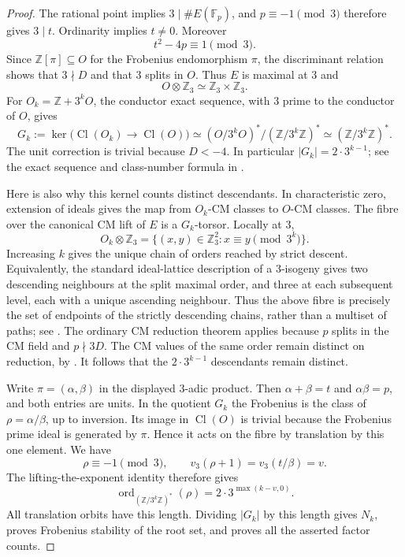 \documentclass[11pt]{article}
\theoremstyle{definition}
\theoremstyle{remark}
\begin{document}
\begin{proof}
The rational point implies $3\mid\#E(\mathbb F_p)$, and
$p\equiv-1\pmod3$ therefore gives $3\mid t$.
Ordinarity implies $t\ne0$.  Moreover
\[
 t^2-4p\equiv1\pmod3.
\]
Since $\mathbb Z[\pi]\subseteq O$ for the Frobenius endomorphism
$\pi$, the discriminant relation shows that $3\nmid D$ and
that $3$ splits in $O$.  Thus $E$ is maximal at $3$ and
\[
 O\otimes\mathbb Z_3\simeq\mathbb Z_3\times\mathbb Z_3.
\]
For $O_k=\mathbb Z+3^kO$, the conductor exact sequence, with
$3$ prime to the conductor of $O$, gives
\[
 G_k:=\ker\bigl(\operatorname{Cl}(O_k)\longrightarrow
                         \operatorname{Cl}(O)\bigr)
 \simeq (O/3^kO)^*/(\mathbb Z/3^k\mathbb Z)^*
 \simeq(\mathbb Z/3^k\mathbb Z)^*.
\]
The unit correction is trivial because $D<-4$.
In particular $|G_k|=2\cdot3^{k-1}$; see the exact sequence
and class-number formula in
\cite[\S3, (3) and (5)]{BrokerLauterSutherland2012}.

Here is also why this kernel counts distinct descendants.
In characteristic zero, extension of ideals gives the map from
$O_k$-CM classes to $O$-CM classes.  The fibre over the canonical
CM lift of $E$ is a $G_k$-torsor.  Locally at $3$,
\[
 O_k\otimes\mathbb Z_3
 =\{(x,y)\in\mathbb Z_3^2:x\equiv y\pmod{3^k}\}.
\]
Increasing $k$ gives the unique chain of orders reached by
strict descent.  Equivalently, the standard ideal-lattice
description of a $3$-isogeny gives two descending neighbours
at the split maximal order, and three at each subsequent
level, each with a unique ascending neighbour.
Thus the above fibre is precisely the set of endpoints of the
strictly descending chains, rather than a multiset of paths;
see \cite[\S4.1]{BrokerLauterSutherland2012}.
The ordinary CM reduction theorem applies because $p$ splits
in the CM field and $p\nmid3D$.  The CM values of the same
order remain distinct on reduction, by
\cite[\S2.4, Proposition~4]{CremonaSutherland2024}.
It follows that the $2\cdot3^{k-1}$ descendants remain distinct.

Write $\pi=(\alpha,\beta)$ in the displayed $3$-adic product.
Then $\alpha+\beta=t$ and $\alpha\beta=p$, and both entries
are units.  In the quotient $G_k$ the Frobenius is the class
of $\rho=\alpha/\beta$, up to inversion.  Its image in
$\operatorname{Cl}(O)$ is trivial because the Frobenius prime
ideal is generated by $\pi$.  Hence it acts on the fibre
by translation by this one element.  We have
\[
 \rho\equiv-1\pmod3,
 \qquad v_3(\rho+1)=v_3(t/\beta)=v.
\]
The lifting-the-exponent identity therefore gives
\[
 \operatorname{ord}_{(\mathbb Z/3^k\mathbb Z)^*}(\rho)
 =2\cdot3^{\max(k-v,0)}.
\]
All translation orbits have this length.  Dividing $|G_k|$
by this length gives $N_k$, proves Frobenius stability of the
root set, and proves all the asserted factor counts.
\end{proof}
\end{document}
